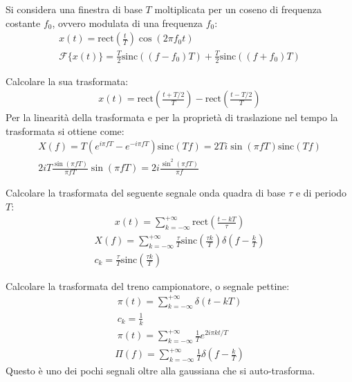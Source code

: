 \documentclass{article}
\newcommand{\rect}{\mbox{rect}}
\newcommand{\sinc}{\mbox{sinc}}
\begin{document}
Si considera una finestra di base $T$ moltiplicata per un coseno di frequenza costante $f_0$, ovvero modulata di una frequenza $f_0$:
\begin{gather*}
    x(t)=\rect\displaystyle\left(\frac{t}{T}\right)\cos(2\pi f_0t)\\
    \mathscr{F}\{x(t)\}=\frac{T}{2}\sinc((f-f_0)T)+\frac{T}{2}\sinc\left((f+f_0)T\right)
\end{gather*}
\begin{center}
\end{center}
Calcolare la sua trasformata:
\begin{gather*}
    x(t)=\rect\left(\displaystyle\frac{t+T/2}{T}\right)-\rect\left(\displaystyle\frac{t-T/2}{T}\right)
\end{gather*}
Per la linearità della trasformata e per la proprietà di traslazione nel tempo la trasformata si ottiene come:
\begin{gather*}
    X(f)=T\left(e^{i\pi fT}-e^{-i\pi fT}\right)\sinc\left(T f\right)=2Ti\sin(\pi fT)\sinc(Tf)\\
    2iT\displaystyle\frac{\sin(\pi fT)}{\pi fT}\sin(\pi fT)=2i\frac{\sin^2(\pi fT)}{\pi f}
\end{gather*}



Calcolare la trasformata del seguente segnale onda quadra di base $\tau$ e di periodo $T$:
\begin{gather*}
    x(t)=\displaystyle\sum_{k=-\infty}^{+\infty}\rect\left(\frac{t-kT}{\tau}\right)
\end{gather*}
\begin{gather}
    X(f)=\displaystyle\sum_{k=-\infty}^{+\infty}\frac{\tau}{T}\sinc\left(\frac{\tau k}{T}\right)\delta\left(f-\frac{k}{T}\right)\\
    c_k=\displaystyle\frac{\tau}{T}\sinc\left(\frac{\tau k}{T}\right)
\end{gather}

Calcolare la trasformata del treno campionatore, o segnale pettine:
\begin{gather*}
    \pi(t)=\displaystyle\sum_{k=-\infty}^{+\infty}\delta(t-kT)\\
    c_k=\displaystyle\frac{1}{k}\\
    \pi(t)=\displaystyle\sum_{k=-\infty}^{+\infty}\frac{1}{T}e^{2i\pi kt/T}
\end{gather*}
\begin{gather}
    \Pi(f)=\displaystyle\sum_{k=-\infty}^{+\infty}\frac{1}{T}\delta\left(f-\frac{k}{T}\right)
\end{gather}
Questo è uno dei pochi segnali oltre alla gaussiana che si auto-trasforma. 
\end{document}

